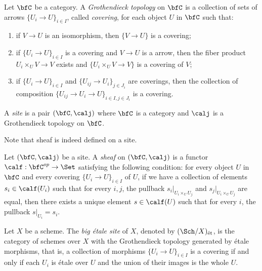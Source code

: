     \begin{definition}\label{def:Grothendieck_topology_and_site}
        Let \(\bfC\) be a category.
        A \emph{Grothendieck topology} on \(\bfC\) is a collection of sets of arrows \(\{U_i \to U\}_{i \in I}\), called \emph{covering}, for each object \(U\) in \(\bfC\) such that:
        \begin{enumerate}
            \item if \(V \to U\) is an isomorphism, then \(\{V \to U\}\) is a covering;
            \item if \(\{U_i \to U\}_{i \in I}\) is a covering and \(V \to U\) is a arrow, then the fiber product \(U_i \times_U V \to V\) exists and \(\{U_i \times_U V \to V\}\) is a covering of \(V\);
            \item if \(\{U_i \to U\}_{i \in I}\) and \(\{U_{ij} \to U_{i}\}_{j \in J_i}\) are coverings, then the collection of composition \(\{U_{ij} \to U_i \to U\}_{i\in I, j\in J_i}\) is a covering.
        \end{enumerate}
        A \emph{site} is a pair \((\bfC, \calj)\) where \(\bfC\) is a category and \(\calj\) is a Grothendieck topology on \(\bfC\).
    \end{definition}

    Note that sheaf is indeed defined on a site.

    \begin{definition}\label{def:sheaves_on_site}
        Let \((\bfC, \calj)\) be a site.
        A \emph{sheaf} on \((\bfC, \calj)\) is a functor \(\calf: \bfC^{op} \to \Set\) satisfying the following condition:
        for every object \(U\) in \(\bfC\) and every covering \(\{U_i \to U\}_{i \in I}\) of \(U\), 
        if we have a collection of elements \(s_i \in \calf(U_i)\) such that for every \(i,j\), 
        the pullback \(s_i|_{U_i \times_U U_j}\) and \(s_j|_{U_i \times_U U_j}\) are equal, 
        then there exists a unique element \(s \in \calf(U)\) such that for every \(i\), the pullback \(s|_{U_i} = s_i\).
    \end{definition}

    \begin{definition}\label{def:big_etale_site}
        Let \(X\) be a scheme.
        The \emph{big \'etale site} of \(X\), denoted by \((\Sch/X)_{\text{\'et}}\), is the category of schemes over \(X\) with the Grothendieck topology generated by \'etale morphisms,
        that is, a collection of morphisms \(\{U_i \to U\}_{i \in I}\) is a covering if and only if each \(U_i\) is \'etale over \(U\) and the union of their images is the whole \(U\).
    \end{definition}


